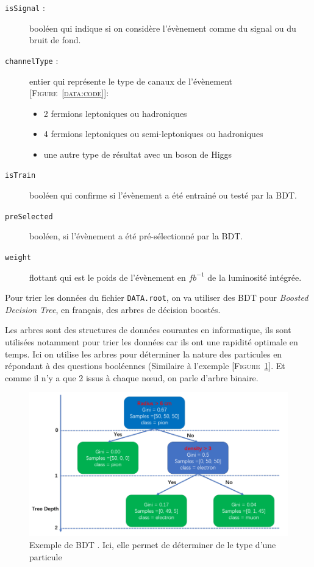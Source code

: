 \documentclass[10pt,a4paper]{report}
\newcommand{\Figure}[1]{[\textsc{Figure~#1}]}
\begin{document}
\begin{description}

	\item[\texttt{isSignal} :] booléen qui indique si on considère l'évènement comme du signal ou du bruit de fond.
	
	\item[\texttt{channelType} :] entier qui représente le type de canaux de l'évènement \Figure{\ref{data:code}}:
	\begin{itemize}
		\item 2 fermions leptoniques ou hadroniques
		\item 4 fermions leptoniques ou semi-leptoniques ou hadroniques 
		\item une autre type de résultat avec un boson de Higgs
	\end{itemize}
	
	\item[\texttt{isTrain}] booléen qui confirme si l'évènement a été entrainé ou testé par la BDT.
	
	\item[\texttt{preSelected}] booléen, si l'évènement a été pré-sélectionné par la BDT.
	
	\item[\texttt{weight}] flottant qui est le poids de l'évènement en $fb^{-1}$ de la luminosité intégrée.
	
\end{description}


Pour trier les données du fichier \texttt{DATA.root}, on va utiliser des BDT pour \textit{Boosted Decision Tree}, en français, des arbres de décision boostés. 

Les arbres sont des structures de données courantes en informatique, ils sont utilisées notamment pour trier les données car ils ont une rapidité optimale en temps. 
Ici on utilise les arbres pour déterminer la nature des particules en répondant à des questions booléennes (Similaire à l'exemple \Figure{\ref{ExampleBDT}}. Et comme il n'y a que 2 issus à chaque nœud, on parle d'arbre binaire. 

\begin{figure}[h!]
	\center
	\includegraphics[width=\textwidth]{../img/ExampleBDT.png}
	\caption{Exemple de BDT \cite{liu:tel-03405418}. Ici, elle permet de déterminer de le type d'une particule}
	\label{ExampleBDT}
\end{figure}
\end{document}
